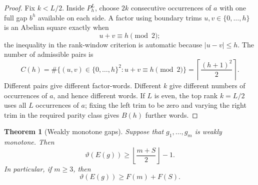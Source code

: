 \documentclass[11pt]{article}
\newtheorem{theorem}{Theorem}[section]
\theoremstyle{definition}
\newcommand{\thetaas}{\vartheta}
\begin{document}
\begin{proof}
Fix $k<L/2$.  Inside $P_h^L$, choose $2k$ consecutive occurrences of $a$ with one full gap $b^h$ available on each side.  A factor using boundary trims $u,v\in\{0,\ldots,h\}$ is an Abelian square exactly when
\[
 u+v\equiv h\pmod2;
\]
the inequality in the rank-window criterion is automatic because $|u-v|\le h$.  The number of admissible pairs is
\[
 C(h)=\#\{(u,v)\in\{0,\ldots,h\}^2:u+v\equiv h\pmod2\}
 =\left\lceil\frac{(h+1)^2}{2}\right\rceil.
\]
Different pairs give different factor-words.  Different $k$ give different numbers of occurrences of $a$, and hence different words.  If $L$ is even, the top rank $k=L/2$ uses all $L$ occurrences of $a$; fixing the left trim to be zero and varying the right trim in the required parity class gives $B(h)$ further words.
\end{proof}

\begin{theorem}[Weakly monotone gaps]\label{thm:monotone-gaps}
Suppose that $g_1,\ldots,g_m$ is weakly monotone.  Then
\[
 \boxed{\thetaas(E(g))\ge
 \left\lfloor\frac{m+S}{2}\right\rfloor-1.}
\]
In particular, if $m\ge3$, then
\[
 \thetaas(E(g))\ge F(m)+F(S).
\]
\end{theorem}
\end{document}
